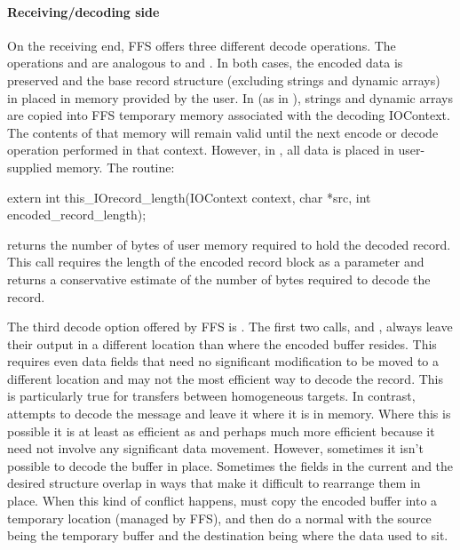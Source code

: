 \paragraph{Receiving/decoding side}
On the receiving end, FFS offers three different decode operations.  The
operations  and 
are analogous to  and .
In both cases, the encoded data is preserved and the base record structure
(excluding strings and dynamic arrays) in placed in memory provided by the
user.  In  (as in ), strings and
dynamic arrays are copied into FFS temporary memory associated with the
decoding IOContext.  The contents of that memory will remain valid until the
next encode or decode operation performed in that context.  However, in
, all data is placed in
user-supplied memory. 
The routine:
\begin{Code}
extern int
this_IOrecord_length(IOContext context, char *src, int encoded_record_length);
\end{Code}
returns the number of bytes of user memory required to hold the decoded record.
This call requires the length of the encoded record block as a parameter and
returns a conservative estimate of the number of bytes required to decode the
record.  

The third decode option offered by FFS is
.  The first two calls,
 and ,
always leave 
their output in a different location than where the encoded buffer resides.
This requires even data fields that need no significant modification to be
moved to a different location and may not the most efficient way to decode the
record.  This is particularly true for transfers between homogeneous targets.
In contrast,  attempts to decode the
message and leave it where it is in memory.  Where this is possible it is at
least as efficient as  and perhaps much more
efficient because it need not involve any significant data movement.  However,
sometimes it isn't possible to decode the buffer in place.  Sometimes the
fields in the current and the desired structure overlap in ways that make it
difficult to rearrange them in place.  When this kind of conflict happens,
 must copy the encoded buffer into a
temporary location (managed by FFS), and then do a normal
 with the source being the temporary buffer and
the 
destination being where the data used to sit.

